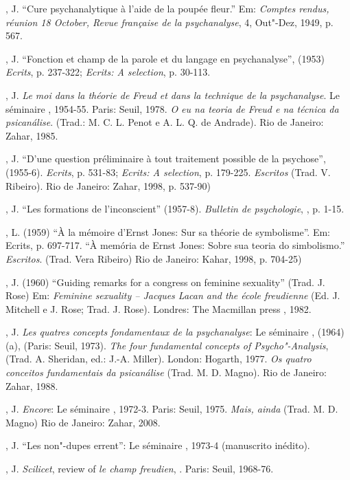 , J. ``Cure psychanalytique à l'aide de la poupée fleur.'' Em:
\emph{Comptes rendus, réunion 18 October, Revue française de la
psychanalyse}, 4, Out"-Dez, 1949, p. 567.

, J. ``Fonction et champ de la parole et du langage en
psychanalyse'', (1953) \emph{Ecrits}, p. 237-322; \emph{Ecrits: A
selection}, p. 30-113.

, J. \emph{Le moi dans la théorie de Freud et dans la technique de
la psychanalyse}. Le séminaire , 1954-55. Paris: Seuil, 1978. \emph{O
eu na teoria de Freud e na técnica da psicanálise}. (Trad.: M. C. L.
Penot e A. L. Q. de Andrade). Rio de Janeiro: Zahar, 1985.

, J. ``D'une question préliminaire à tout traitement possible de la
psychose'', (1955-6). \emph{Ecrits}, p. 531-83; \emph{Ecrits: A
selection}, p. 179-225. \emph{Escritos} (Trad. V. Ribeiro). Rio de
Janeiro: Zahar, 1998, p. 537-90)

, J. ``Les formations de l'inconscient'' (1957-8). \emph{Bulletin de
psychologie}, , p. 1-15.

, L. (1959) ``À la mémoire d'Ernst Jones: Sur sa théorie de
symbolisme''. Em: Ecrits, p. 697-717. ``À memória de Ernst Jones: Sobre
sua teoria do simbolismo.'' \emph{Escritos}. (Trad. Vera Ribeiro) Rio
de Janeiro: Kahar, 1998, p. 704-25)

, J. (1960) ``Guiding remarks for a congress on feminine sexuality''
(Trad. J. Rose) Em: \emph{Feminine sexuality -- Jacques Lacan and the
école freudienne} (Ed. J. Mitchell e J. Rose; Trad. J. Rose).
Londres: The Macmillan press , 1982.

, J. \emph{Les quatres concepts fondamentaux de la psychanalyse}:
Le séminaire , (1964) (a), (Paris: Seuil, 1973). \emph{The four
fundamental concepts of Psycho"-Analysis}, (Trad. A. Sheridan, ed.:
J.-A. Miller). London: Hogarth, 1977. \emph{Os quatro conceitos
fundamentais da psicanálise} (Trad. M. D. Magno). Rio de Janeiro:
Zahar, 1988.

, J. \emph{Encore}: Le séminaire , 1972-3. Paris: Seuil, 1975.
\emph{Mais, ainda} (Trad. M. D. Magno) Rio de Janeiro: Zahar, 2008.

, J. ``Les non"-dupes errent'': Le séminaire , 1973-4 (manuscrito
inédito).

, J. \emph{Scilicet}, review of \emph{le champ freudien}, .
Paris: Seuil, 1968-76.

